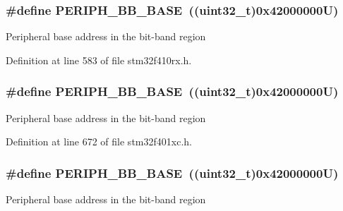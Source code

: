 \subsubsection[{\texorpdfstring{P\+E\+R\+I\+P\+H\+\_\+\+B\+B\+\_\+\+B\+A\+SE}{PERIPH_BB_BASE}}]{\setlength{\rightskip}{0pt plus 5cm}\#define P\+E\+R\+I\+P\+H\+\_\+\+B\+B\+\_\+\+B\+A\+SE~((uint32\+\_\+t)0x42000000\+U)}\hypertarget{group___peripheral__registers__structures_gaed7efc100877000845c236ccdc9e144a}{}\label{group___peripheral__registers__structures_gaed7efc100877000845c236ccdc9e144a}
Peripheral base address in the bit-\/band region 

Definition at line 583 of file stm32f410rx.\+h.

\subsubsection[{\texorpdfstring{P\+E\+R\+I\+P\+H\+\_\+\+B\+B\+\_\+\+B\+A\+SE}{PERIPH_BB_BASE}}]{\setlength{\rightskip}{0pt plus 5cm}\#define P\+E\+R\+I\+P\+H\+\_\+\+B\+B\+\_\+\+B\+A\+SE~((uint32\+\_\+t)0x42000000\+U)}\hypertarget{group___peripheral__registers__structures_gaed7efc100877000845c236ccdc9e144a}{}\label{group___peripheral__registers__structures_gaed7efc100877000845c236ccdc9e144a}
Peripheral base address in the bit-\/band region 

Definition at line 672 of file stm32f401xc.\+h.

\subsubsection[{\texorpdfstring{P\+E\+R\+I\+P\+H\+\_\+\+B\+B\+\_\+\+B\+A\+SE}{PERIPH_BB_BASE}}]{\setlength{\rightskip}{0pt plus 5cm}\#define P\+E\+R\+I\+P\+H\+\_\+\+B\+B\+\_\+\+B\+A\+SE~((uint32\+\_\+t)0x42000000\+U)}\hypertarget{group___peripheral__registers__structures_gaed7efc100877000845c236ccdc9e144a}{}\label{group___peripheral__registers__structures_gaed7efc100877000845c236ccdc9e144a}
Peripheral base address in the bit-\/band region 

